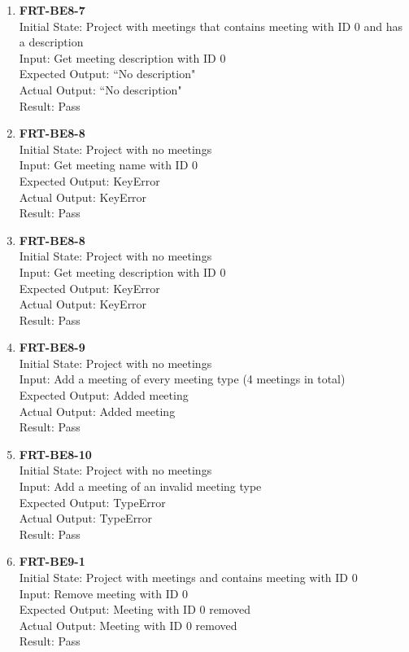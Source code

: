 \documentclass[12pt, titlepage]{article}
\begin{document}
\begin{enumerate}
    \item{\textbf{FRT-BE8-7}}\\
    Initial State: Project with meetings that contains meeting with ID 0 and has a description\\
    Input: Get meeting description with ID 0\\
    Expected Output: ``No description"\\
    Actual Output: ``No description"\\
    Result: Pass
    
    \item{\textbf{FRT-BE8-8}}\\
    Initial State: Project with no meetings\\
    Input: Get meeting name with ID 0\\
    Expected Output: KeyError\\
    Actual Output: KeyError\\
    Result: Pass
    
    \item{\textbf{FRT-BE8-8}}\\
    Initial State: Project with no meetings\\
    Input: Get meeting description with ID 0\\
    Expected Output: KeyError\\
    Actual Output: KeyError\\
    Result: Pass
    
    \item{\textbf{FRT-BE8-9}}\\
    Initial State: Project with no meetings\\
    Input: Add a meeting of every meeting type (4 meetings in total)\\
    Expected Output: Added meeting\\
    Actual Output: Added meeting\\
    Result: Pass
    
    \item{\textbf{FRT-BE8-10}}\\
    Initial State: Project with no meetings\\
    Input: Add a meeting of an invalid meeting type\\
    Expected Output: TypeError\\
    Actual Output: TypeError\\
    Result: Pass
    
    \item{\textbf{FRT-BE9-1}}\\
    Initial State: Project with meetings and contains meeting with ID 0\\
    Input: Remove meeting with ID 0\\
    Expected Output: Meeting with ID 0 removed\\
    Actual Output: Meeting with ID 0 removed\\
    Result: Pass
    

\end{enumerate}
\end{document}
